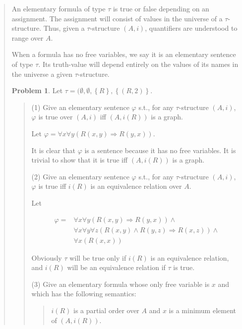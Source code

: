 \documentclass[a4paper, 12pt]{article}
\theoremstyle{definition}
\newtheorem{problem}{Problem}
\theoremstyle{definition}
\theoremstyle{definition}
\begin{document}
\begin{quote}
An elementary formula of type $\tau$ is true or false depending on 
an assignment. The assignment will consist of values in the 
universe of a $\tau$-structure. Thus, given a $\tau$-structure 
$(A, i)$, quantifiers are understood to range over $A$.

When a formula has no free variables, we say it is an elementary sentence of
type $\tau$. Its truth-value will depend entirely on the values of its names in
the universe a given $\tau$-structure.

\begin{problem}
    Let $\tau = (\emptyset, \emptyset, \left\{ R \right\} , \left\{ (R, 2) \right\} $.
\end{problem}


\small
\begin{quote}

    (1) Give an elementary sentence $\varphi$ s.t., for any $\tau$-structure $(A, i)$,
    $\varphi$ is true over $(A, i)$ iff $(A, i(R))$ is a graph.

    Let $\varphi = \forall x \forall y \left( R(x, y) \Rightarrow R(y, x) \right) $.

    It is clear that $\varphi$ is a sentence because it has no free variables.
    It is trivial to show that it is true iff $(A, i(R))$ is a graph.
    

    (2) Give an elementary sentence $\varphi$ s.t., for any $\tau$-structure 
    $(A, i)$, $\varphi$ is true iff $i(R)$ is an equivalence  
    relation over $A$.

    Let $ $

    \begin{align*}
        \varphi = &\forall x \forall y \left( R(x, y) \Rightarrow R(y, x)  \right) \land \\ 
        &\forall x \forall y \forall z \left( R(x, y) \land  R(y, z) \Rightarrow R(x, z) \right) \land  \\ 
        &\forall x \left( R(x, x) \right) 
    \end{align*}

    Obviously $\tau$ will be true only if $i(R)$ is an equivalence relation,
    and $i(R)$ will be an equivalence relation if $\tau$ is true.

    (3) Give an elementary formula whose only free variable is $x$
    and which has the following semantics:

    \begin{quote}
        $i(R)$ is a partial order over $A$ and $x$ is a minimum element of 
        $(A, i(R))$.
    \end{quote}


\end{quote}
\end{quote}
\end{document}
